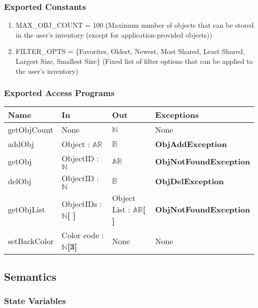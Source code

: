 \documentclass[12pt, titlepage]{article}
\begin{document}
\subsubsection{Exported Constants}
\begin{enumerate}
  \item MAX\_OBJ\_COUNT = 100 (Maximum number of objects that can be stored in the user's inventory (except for application-provided objects))
  \item FILTER\_OPTS = \{Favorites, Oldest, Newest, Most Shared, Least Shared, Largest Size, Smallest Size\} (Fixed list of filter options that can be applied to the user's inventory)
\end{enumerate}

\subsubsection{Exported Access Programs}

\begin{center}
  \begin{tabular}{p{4cm} p{4cm} p{4cm} p{4cm}}
    \hline
    \textbf{Name} & \textbf{In} & \textbf{Out} & \textbf{Exceptions} \\
    \hline
    getObjCount & None & $\mathbb{N}$ & None \\
    \hline
    addObj & Object : $\mathbb{AR}$ & $\mathbb{B}$ & \textbf{ObjAddException} \\
    \hline
    getObj & ObjectID : $\mathbb{N}$ & $\mathbb{AR}$ & \textbf{ObjNotFoundException} \\
    \hline
    delObj & ObjectID : $\mathbb{N}$ & $\mathbb{B}$ & \textbf{ObjDelException} \\
    \hline
    getObjList & ObjectIDs : $\mathbb{N}$\textbf{[ ]} & Object List : $\mathbb{AR}$\textbf{[ ]} & \textbf{ObjNotFoundException} \\
    \hline
    setBackColor & Color code : $\mathbb{N}$\textbf{[3]} & None & None \\
    \hline
  \end{tabular}
\end{center}

\subsection{Semantics}

\subsubsection{State Variables}
\end{document}
